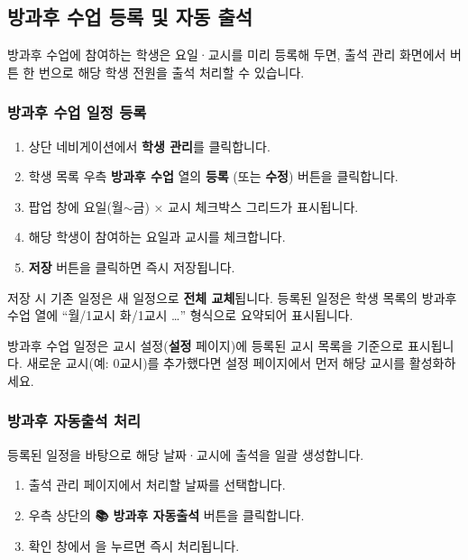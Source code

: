 \documentclass[a4paper,12pt]{article}
\newcommand{\menu}[1]{\textcolor{primary}{\textbf{#1}}}
\newcommand{\key}[1]{\fbox{\small\texttt{#1}}}
\begin{document}
\subsection{방과후 수업 등록 및 자동 출석}

방과후 수업에 참여하는 학생은 요일·교시를 미리 등록해 두면, 출석 관리 화면에서
버튼 한 번으로 해당 학생 전원을 출석 처리할 수 있습니다.

\subsubsection{방과후 수업 일정 등록}

\begin{enumerate}[leftmargin=1.5em]
    \item 상단 네비게이션에서 \menu{학생 관리}를 클릭합니다.
    \item 학생 목록 우측 \textbf{방과후 수업} 열의 \menu{등록} (또는 \menu{수정}) 버튼을 클릭합니다.
    \item 팝업 창에 요일(월$\sim$금) × 교시 체크박스 그리드가 표시됩니다.
    \item 해당 학생이 참여하는 요일과 교시를 체크합니다.
    \item \menu{저장} 버튼을 클릭하면 즉시 저장됩니다.
\end{enumerate}

\begin{notebox}
  저장 시 기존 일정은 새 일정으로 \textbf{전체 교체}됩니다.
  등록된 일정은 학생 목록의 방과후 수업 열에 ``월/1교시 화/1교시 \ldots'' 형식으로 요약되어 표시됩니다.
\end{notebox}

\begin{warnbox}
  방과후 수업 일정은 교시 설정(\menu{설정} 페이지)에 등록된 교시 목록을 기준으로 표시됩니다.
  새로운 교시(예: 0교시)를 추가했다면 설정 페이지에서 먼저 해당 교시를 활성화하세요.
\end{warnbox}

\subsubsection{방과후 자동출석 처리}

등록된 일정을 바탕으로 해당 날짜·교시에 출석을 일괄 생성합니다.

\begin{enumerate}[leftmargin=1.5em]
    \item 출석 관리 페이지에서 처리할 날짜를 선택합니다.
    \item 우측 상단의 \menu{📚 방과후 자동출석} 버튼을 클릭합니다.
    \item 확인 창에서 \key{확인}을 누르면 즉시 처리됩니다.
\end{enumerate}
\end{document}
